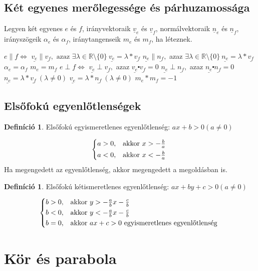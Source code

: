 \documentclass[twoside,12pt]{report}
\renewcommand{\vec}{\underline}
\theoremstyle{definition}
\newtheorem{definition}[theorem]{Definíció}
\begin{document}
\section{Két egyenes merőlegessége és párhuzamossága}
	Legyen két egyenes $e$ és $f$, irányvektoraik $\vec{v}_e$ és $\vec{v}_f$, normálvektoraik $\vec{n}_e$ és $\vec{n}_f$, irányszögeik $\alpha_e$ és $\alpha_f$, iránytangenseik $m_e$ és $m_f$, ha léteznek.
	\begin{outline}
		\1 $e\|f\Leftrightarrow$
			\2[] $\vec{v_e}\|\vec{v_f},\text{ azaz }\exists\lambda\in\mathbb{R}\setminus\{0\}\ \vec{v_e}=\lambda*\vec{v_f}$
			\2[] $\vec{n_e}\|\vec{n_f},$ azaz $\exists\lambda\in\mathbb{R}\setminus\{0\}\ \vec{n_e}=\lambda*\vec{v_f}$
			\2[] $\alpha_e=\alpha_f$
			\2[] $m_e=m_f$
		\1 $e\perp f\Leftrightarrow$
			\2[] $\vec{v_e}\perp \vec{v_f},$ azaz $\vec{v_e}\centerdot\vec{v_f}=0$
			\2[] $\vec{n_e}\perp \vec{n_f},$ azaz $\vec{n_e}\centerdot\vec{n_f}=0$
			\2[] $\vec{n_e}=\lambda*\vec{v_f}\ (\lambda\ne0)$
			\2[] $\vec{v_e}=\lambda*\vec{n_f}\ (\lambda\ne0)$
			\2[] $m_e*m_f=-1$
	\end{outline}
\section{Elsőfokú egyenlőtlenségek}
	\begin{definition}
		Elsőfokú egyismeretlenes egyenlőtlenség: $ax+b>0 (a\ne0)$
	\end{definition}
	\begin{equation*}
		\begin{cases*}
			a>0,& akkor $x>-\frac{b}{a}$\\
			a<0,& akkor $x<-\frac{b}{a}$
		\end{cases*}
	\end{equation*}
	Ha megengedett az egyenlőtlenség, akkor megengedett a megoldásban is.
	\begin{definition}
		Elsőfokú kétismeretlenes egyenlőtlenség: $ax+by+c>0 (a\ne0)$
	\end{definition}
	\begin{equation*}
		\begin{cases*}
			b>0,& akkor $y>-\frac{a}{b}x-\frac{c}{b}$\\
			b<0,& akkor $y<-\frac{a}{b}x-\frac{c}{b}$\\
			b=0,& akkor $ax+c>0$ egyismeretlenes egyenlőtlenség
		\end{cases*}
	\end{equation*}
\chapter{Kör és parabola}
\end{document}
